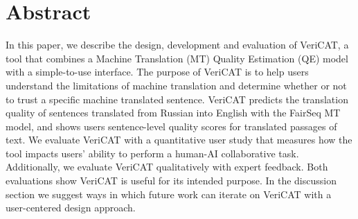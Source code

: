 \section{Abstract}


In this paper, we describe the design, development and evaluation of VeriCAT, a tool that combines a Machine Translation (MT) Quality Estimation (QE) model with a simple-to-use interface. The purpose of VeriCAT is to help users understand the limitations of machine translation and determine whether or not to trust a specific machine translated sentence. VeriCAT predicts the translation quality of sentences translated from Russian into English with the FairSeq MT model, and shows users sentence-level quality scores for translated passages of text. We evaluate VeriCAT with a quantitative user study that measures how the tool impacts users’ ability to perform a human-AI collaborative task. Additionally, we evaluate VeriCAT qualitatively with expert feedback. Both evaluations show VeriCAT is useful for its intended purpose. In the discussion section we suggest ways in which future work can iterate on VeriCAT with a user-centered design approach. 
